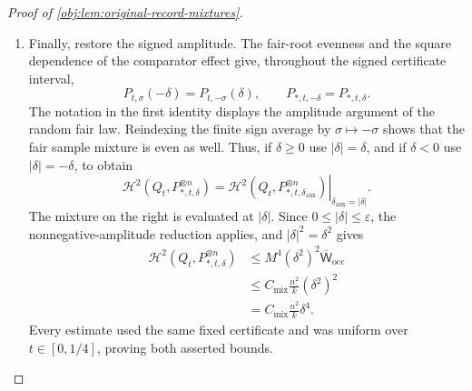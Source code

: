 \begin{proof}[Proof of \cref{obj:lem:original-record-mixtures}]
\begin{enumerate}
\item Finally, restore the signed amplitude. The fair-root evenness and
the square dependence of the comparator effect give, throughout the
signed certificate interval,
\[
P_{t,\sigma}(-\delta)=P_{t,-\sigma}(\delta),
\qquad
P_{*,t,-\delta}=P_{*,t,\delta}.
\]
The notation in the first identity displays the amplitude argument of
the random fair law. Reindexing the finite sign average by
\(\sigma\mapsto-\sigma\) shows that the fair sample mixture is even
as well. Thus, if \(\delta\ge0\) use \(|\delta|=\delta\), and if
\(\delta<0\) use \(|\delta|=-\delta\), to obtain
\[
\mathcal H^2(Q_t,P_{*,t,\delta}^{\otimes n})
=
\left.
\mathcal H^2(Q_t,P_{*,t,\delta_{\mathrm{aux}}}^{\otimes n})
\right|_{\delta_{\mathrm{aux}}=|\delta|}.
\]
The mixture on the right is evaluated at \(|\delta|\).
Since \(0\le|\delta|\le\varepsilon\), the nonnegative-amplitude
reduction applies, and \(|\delta|^2=\delta^2\) gives
\[
\begin{aligned}
\mathcal H^2(Q_t,P_{*,t,\delta}^{\otimes n})
&\le M^4(\delta^2)^2\overline{\mathsf W}_{\mathrm{occ}}\\
&\le C_{\mathrm{mix}}\frac{n^2}{k}(\delta^2)^2\\
&=C_{\mathrm{mix}}\frac{n^2}{k}\delta^4.
\end{aligned}
\]
Every estimate used the same fixed certificate and was uniform over
\(t\in[0,1/4]\), proving both asserted bounds.
\end{enumerate}
\end{proof}
